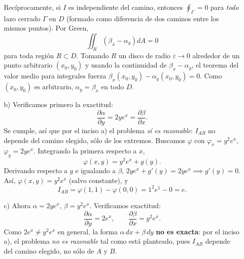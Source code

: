 \documentclass[12pt,a4paper]{article}
\newcommand{\paren}[1]{\left( #1 \right)}
\begin{document}
\begin{solucion}
\begin{enumerate}
            Recíprocamente, si $I$ es independiente del camino, entonces $\oint_{\Gamma}=0$ para
            \emph{todo} lazo cerrado $\Gamma$ en $D$ (formado como diferencia de dos caminos
            entre los mismos puntos). Por Green,
            \begin{equation*}
                \iint_{R}\paren{\beta_{x}-\alpha_{y}}dA=0
            \end{equation*}
            para toda región $R\subset D$. Tomando $R$ un disco de radio $\varepsilon\to0$
            alrededor de un punto arbitrario $(x_{0},y_{0})$ y usando la continuidad de
            $\beta_{x}-\alpha_{y}$, el teorema del valor medio para integrales fuerza
            $\beta_{x}(x_{0},y_{0})-\alpha_{y}(x_{0},y_{0})=0$. Como $(x_{0},y_{0})$ es
            arbitrario, $\alpha_{y}=\beta_{x}$ en todo $D$.
            \item[b)] Verificamos primero la exactitud:
            \begin{equation*}
                \frac{\partial\alpha}{\partial y}=2ye^{x}=\frac{\partial\beta}{\partial x}.
            \end{equation*}
            Se cumple, así que por el inciso a) el problema \emph{sí es razonable}: $I_{AB}$
            no depende del camino elegido, sólo de los extremos. Buscamos $\varphi$ con
            $\varphi_{x}=y^{2}e^{x}$, $\varphi_{y}=2ye^{x}$. Integrando la primera respecto a $x$,
            \begin{equation*}
                \varphi(x,y)=y^{2}e^{x}+g(y).
            \end{equation*}
            Derivando respecto a $y$ e igualando a $\beta$, $2ye^{x}+g'(y)=2ye^{x}\implies g'(y)=0$.
            Así, $\varphi(x,y)=y^{2}e^{x}$ (salvo constante), y
            \begin{equation*}
                I_{AB}=\varphi(1,1)-\varphi(0,0)=1^{2}e^{1}-0=e.
            \end{equation*}
            \item[c)] Ahora $\alpha=2ye^{x}$, $\beta=y^{2}e^{x}$. Verificamos exactitud:
            \begin{equation*}
                \frac{\partial\alpha}{\partial y}=2e^{x}, \qquad \frac{\partial\beta}{\partial x}=y^{2}e^{x}.
            \end{equation*}
            Como $2e^{x}\neq y^{2}e^{x}$ en general, la forma $\alpha\,dx+\beta\,dy$
            \textbf{no es exacta}: por el inciso a), el problema \emph{no es razonable} tal como
            está planteado, pues $I_{AB}$ depende del camino elegido, no sólo de $A$ y $B$.

\end{enumerate}
\end{solucion}
\end{document}
